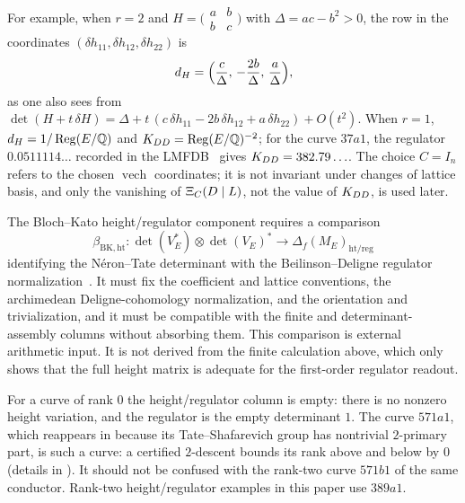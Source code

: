 For example, when $r=2$ and $H=\bigl(\begin{smallmatrix}a&b\\
b&c\end{smallmatrix}\bigr)$ with $\Delta=ac-b^2>0$, the row in the
coordinates $(\delta h_{11},\delta h_{12},\delta h_{22})$ is
\[
  d_H=\Bigl(\frac{c}{\Delta},\,-\frac{2b}{\Delta},\,\frac{a}{\Delta}\Bigr),
\]
as one also sees from $\det(H+t\,\delta H)=\Delta+t\,(c\,\delta h_{11}-2b\,
\delta h_{12}+a\,\delta h_{22})+O(t^2)$.  When $r=1$, $d_H=1/\operatorname{Reg}(E/\mathbb{Q})$
and $K_{DD}=\operatorname{Reg}(E/\mathbb{Q})^{-2}$; for the curve $37a1$, the regulator
$0.0511114\ldots$ recorded in the LMFDB~\citep{LMFDB} gives
$K_{DD}=382.79\ldots$.  The choice $C=I_n$ refers to the chosen
$\operatorname{vech}$ coordinates; it is not invariant under changes of
lattice basis, and only the vanishing of $\Xi_C(D\mid L)$, not the value of $K_{DD}$,
is used later.

\begin{obligation}\label{obl:apparatus:rho-ht-reg-transport}
The Bloch--Kato height/regulator component requires a comparison
\[
  \beta_{\mathrm{BK,ht}}:
  \det(V_E^*)\otimes\det(V_E)^*
  \longrightarrow
  \Delta_f(M_E)_{\mathrm{ht/reg}}
\]
identifying the N\'eron--Tate determinant with the Beilinson--Deligne
regulator normalization~\citep{Beilinson1985}.  It must fix
the coefficient and lattice conventions, the archimedean
Deligne-cohomology normalization, and the orientation and
trivialization, and it must be compatible with the finite and
determinant-assembly columns without absorbing them.  This comparison is
external arithmetic input.  It is not derived from the finite calculation
above, which only shows that the full height matrix is adequate for the
first-order regulator readout.
\end{obligation}

\begin{warning}\label{warn:apparatus:571a1-carrier}
For a curve of rank $0$ the height/regulator column is empty: there is no
nonzero height variation, and the regulator is the empty determinant $1$.
The curve $571a1$, which reappears in  because
its Tate--Shafarevich group has nontrivial $2$-primary part, is such a
curve: a certified $2$-descent bounds its rank above and below by $0$
(details in ).  It should not be confused with
the rank-two curve $571b1$ of the same conductor.  Rank-two
height/regulator examples in this paper use $389a1$.
\end{warning}
